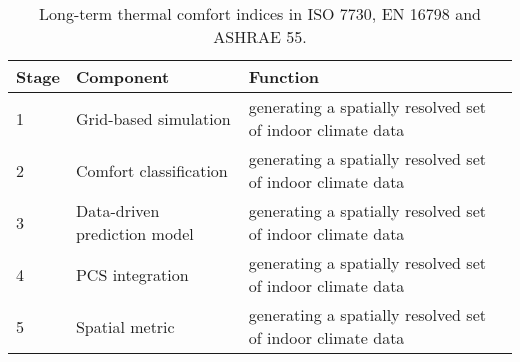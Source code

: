 \begin{table}[H]
    \caption{Long-term thermal comfort indices in ISO 7730, EN 16798 and ASHRAE 55.}
        \label{tab:comfort-indices}
        \renewcommand{\arraystretch}{1.7}
        

        
            \begin{tabular}{ p{1cm} p{3cm} p{8cm} }

            \textbf{Stage} & \textbf{Component} & \textbf{Function} \\

            \hline

            1 & Grid-based \newline simulation           & generating a spatially resolved set of indoor climate data \\
            2 & Comfort \newline classification   & generating a spatially resolved set of indoor climate data \\
            3 & {Data-driven \newline prediction model}    & generating a spatially resolved set of indoor climate data \\
            4 & PCS integration                 & generating a spatially resolved set of indoor climate data \\
            5 & Spatial metric                  & generating a spatially resolved set of indoor climate data \\
            

            
            \end{tabular}
    
    
\end{table}

